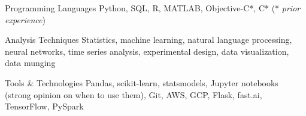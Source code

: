 
\begin{cvskills}

\vspace{0.1cm}

  \cvskill
    {Programming Languages} %
    {Python, SQL, R, MATLAB, Objective-C*, C* (* \textit{prior experience})} %

\vspace{0.1cm}

  \cvskill
    {Analysis Techniques} %
    {Statistics, machine learning, natural language processing, neural networks, time series analysis, experimental design, data visualization, data munging} %


  \cvskill
    {Tools \& Technologies} %
    {Pandas, scikit-learn, statsmodels, Jupyter notebooks (strong opinion on when to use them), Git, AWS, GCP, Flask, fast.ai, TensorFlow, PySpark} %


\end{cvskills}
